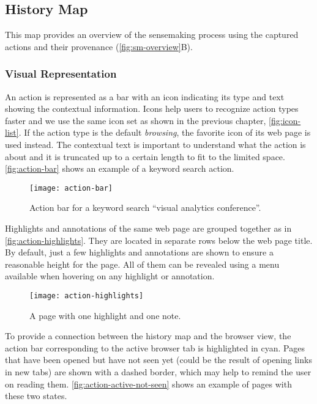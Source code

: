 \subsection{History Map}
\label{sub:collection}
This map provides an overview of the sensemaking process using the captured actions and their provenance (\autoref{fig:sm-overview}B).

\subsubsection{Visual Representation}
An action is represented as a bar with an icon indicating its type and text showing the contextual information. Icons help users to recognize action types faster and we use the same icon set as shown in the previous chapter, \autoref{fig:icon-list}. If the action type is the default \textit{browsing}, the favorite icon of its web page is used instead. The contextual text is important to understand what the action is about and it is truncated up to a certain length to fit to the limited space. \autoref{fig:action-bar} shows an example of a keyword search action.

\begin{figure}[!htb]
	\centering
	\texttt{[image: action-bar]}
	\caption{Action bar for a keyword search ``visual analytics conference''.}
	\label{fig:action-bar}
\end{figure}

Highlights and annotations of the same web page are grouped together as in \autoref{fig:action-highlights}. They are located in separate rows below the web page title. By default, just a few highlights and annotations are shown to ensure a reasonable height for the page. All of them can be revealed using a menu available when hovering on any highlight or annotation.

\begin{figure}[!htb]
	\centering
	\texttt{[image: action-highlights]}
	\caption{A page with one highlight and one note.}
	\label{fig:action-highlights}
\end{figure}

To provide a connection between the history map and the browser view, the action bar corresponding to the active browser tab is highlighted in cyan. Pages that have been opened but have not seen yet (could be the result of opening links in new tabs) are shown with a dashed border, which may help to remind the user on reading them. \autoref{fig:action-active-not-seen} shows an example of pages with these two states.


